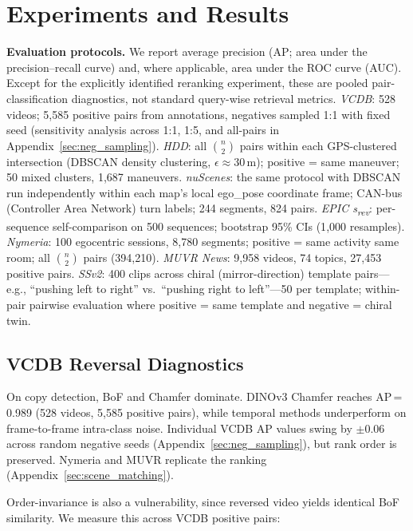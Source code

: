\documentclass{article}
\theoremstyle{remark}
\begin{document}
\section{Experiments and Results}

\textbf{Evaluation protocols.} We report average precision (AP; area under the precision--recall curve) and, where applicable, area under the ROC curve (AUC). Except for the explicitly identified reranking experiment, these are pooled pair-classification diagnostics, not standard query-wise retrieval metrics. \emph{VCDB}: 528 videos; 5{,}585 positive pairs from annotations, negatives sampled 1:1 with fixed seed (sensitivity analysis across 1:1, 1:5, and all-pairs in Appendix~\ref{sec:neg_sampling}). \emph{HDD}: all $\binom{n}{2}$ pairs within each GPS-clustered intersection (DBSCAN density clustering, $\epsilon\!\approx\!30$\,m); positive = same maneuver; 50 mixed clusters, 1{,}687 maneuvers. \emph{nuScenes}: the same protocol with DBSCAN run independently within each map's local ego\_pose coordinate frame; CAN-bus (Controller Area Network) turn labels; 244 segments, 824 pairs. \emph{EPIC s\textsubscript{rev}}: per-sequence self-comparison on 500 sequences; bootstrap 95\% CIs (1{,}000 resamples). \emph{Nymeria}: 100 egocentric sessions, 8{,}780 segments; positive = same activity same room; all $\binom{n}{2}$ pairs (394{,}210). \emph{MUVR News}: 9{,}958 videos, 74 topics, 27{,}453 positive pairs. \emph{SSv2}: 400 clips across chiral (mirror-direction) template pairs---e.g., ``pushing left to right'' vs.\ ``pushing right to left''---50 per template; within-pair pairwise evaluation where positive = same template and negative = chiral twin.

\subsection{VCDB Reversal Diagnostics}

On copy detection, BoF and Chamfer dominate. DINOv3 Chamfer reaches AP\,=\,0.989 (528 videos, 5{,}585 positive pairs), while temporal methods underperform on frame-to-frame intra-class noise. Individual VCDB AP values swing by ${\pm}0.06$ across random negative seeds (Appendix~\ref{sec:neg_sampling}), but rank order is preserved. Nymeria and MUVR replicate the ranking (Appendix~\ref{sec:scene_matching}).

Order-invariance is also a vulnerability, since reversed video yields identical BoF similarity. We measure this across VCDB positive pairs:
\end{document}
